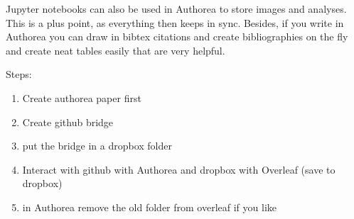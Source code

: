 Jupyter notebooks can also be used in Authorea to store images and analyses. This is a plus point, as everything then keeps in sync. Besides, if you write in Authorea you can draw in bibtex citations and create bibliographies on the fly and create neat tables easily that are very helpful. 

Steps:
\begin{enumerate}
\item Create authorea paper first
\item Create github bridge
\item put the bridge in a dropbox folder
\item Interact with github with Authorea and dropbox with Overleaf (save to dropbox)
\item in Authorea remove the old folder from overleaf if you like
\end{enumerate}


